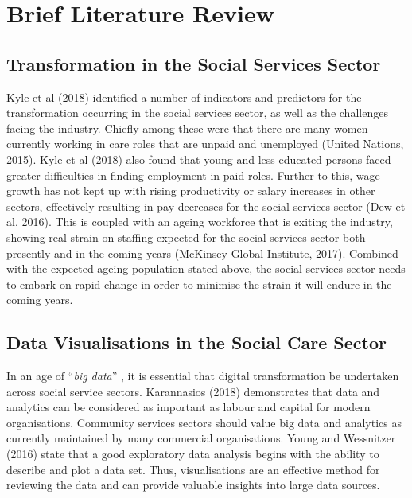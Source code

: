 \documentclass[11pt,]{article}
\begin{document}
\section{Brief Literature Review}\label{brief-literature-review}

\subsection{Transformation in the Social Services
Sector}\label{transformation-in-the-social-services-sector}

Kyle et al (2018) identified a number of indicators and predictors for
the transformation occurring in the social services sector, as well as
the challenges facing the industry. Chiefly among these were that there
are many women currently working in care roles that are unpaid and
unemployed (United Nations, 2015). Kyle et al (2018) also found that
young and less educated persons faced greater difficulties in finding
employment in paid roles. Further to this, wage growth has not kept up
with rising productivity or salary increases in other sectors,
effectively resulting in pay decreases for the social services sector
(Dew et al, 2016). This is coupled with an ageing workforce that is
exiting the industry, showing real strain on staffing expected for the
social services sector both presently and in the coming years (McKinsey
Global Institute, 2017). Combined with the expected ageing population
stated above, the social services sector needs to embark on rapid change
in order to minimise the strain it will endure in the coming years.

\newpage

\subsection{Data Visualisations in the Social Care
Sector}\label{data-visualisations-in-the-social-care-sector}

In an age of ``\emph{big data}'' , it is essential that digital
transformation be undertaken across social service sectors. Karannasios
(2018) demonstrates that data and analytics can be considered as
important as labour and capital for modern organisations. Community
services sectors should value big data and analytics as currently
maintained by many commercial organisations. Young and Wessnitzer (2016)
state that a good exploratory data analysis begins with the ability to
describe and plot a data set. Thus, visualisations are an effective
method for reviewing the data and can provide valuable insights into
large data sources.
\end{document}
